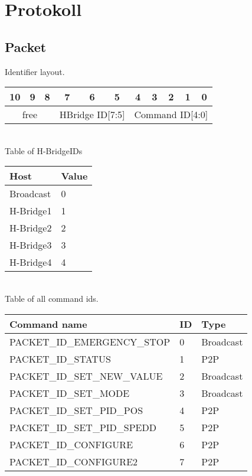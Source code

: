 \documentclass{article}
\begin{document}
\section{Protokoll}
\subsection{Packet}

Identifier layout.\\
\begin{tabular} { c c c c c c c c c c c}
  10&9&8&7&6&5&4&3&2&1&0\\
  \hline
  \multicolumn{3}{|c|}{free} & 
  \multicolumn{3}{c|}{HBridge ID[7:5]} &
  \multicolumn{5}{c|}{Command ID[4:0]} \\
  \hline
\end{tabular}\\

Table of H-BridgeIDs\\
\begin{tabular} {|l|l|}
  \hline
  Host & Value\\
  \hline
  \hline
  Broadcast & 0\\
  \hline
  H-Bridge1 & 1\\
  \hline
  H-Bridge2 & 2\\
  \hline
  H-Bridge3 & 3\\
  \hline
  H-Bridge4 & 4\\
  \hline
\end{tabular}\\


Table of all command ids.\\
\begin{tabular} {|l|l|l|}
  \hline
  Command name & ID & Type\\
  \hline
  \hline
  PACKET\_ID\_EMERGENCY\_STOP & 0 & Broadcast\\
  \hline
  PACKET\_ID\_STATUS & 1 & P2P\\
  \hline
  PACKET\_ID\_SET\_NEW\_VALUE & 2 & Broadcast\\
  \hline
  PACKET\_ID\_SET\_MODE & 3 & Broadcast\\
  \hline
  PACKET\_ID\_SET\_PID\_POS & 4 & P2P\\
  \hline
  PACKET\_ID\_SET\_PID\_SPEDD & 5 & P2P\\
  \hline
  PACKET\_ID\_CONFIGURE & 6 & P2P\\
  \hline
  PACKET\_ID\_CONFIGURE2 & 7 & P2P\\
  \hline
\end{tabular}\\
\end{document}

